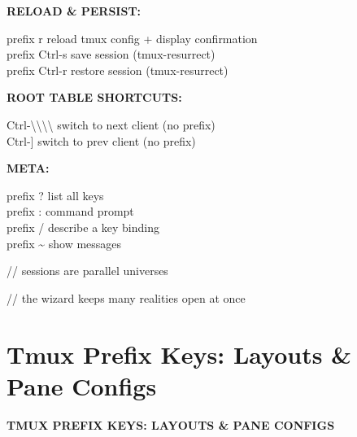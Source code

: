 \documentclass[11pt,a4paper,twoside]{book}
\begin{document}
\vspace{12pt}
{\bfseries\color{neonyellow} RELOAD \& PERSIST:}\vspace{4pt}

\begin{codebox}
prefix r              reload tmux config + display confirmation\\
prefix Ctrl-s         save session (tmux-resurrect)\\
prefix Ctrl-r         restore session (tmux-resurrect)\\
\end{codebox}


\vspace{12pt}
{\bfseries\color{neonyellow} ROOT TABLE SHORTCUTS:}\vspace{4pt}

\begin{codebox}
Ctrl-\textbackslash{}\textbackslash{}\textbackslash{}\textbackslash{}               switch to next client (no prefix)\\
Ctrl-]               switch to prev client (no prefix)\\
\end{codebox}


\vspace{12pt}
{\bfseries\color{neonyellow} META:}\vspace{4pt}

\begin{codebox}
prefix ?              list all keys\\
prefix :              command prompt\\
prefix /              describe a key binding\\
prefix \textasciitilde{}              show messages\\
\end{codebox}

// sessions are parallel universes

// the wizard keeps many realities open at once


\vspace{16pt}

\section{Tmux Prefix Keys: Layouts \& Pane Configs}


\vspace{10pt}
{\large\bfseries\color{neoncyan} TMUX PREFIX KEYS: LAYOUTS \& PANE CONFIGS}\vspace{6pt}
\end{document}
